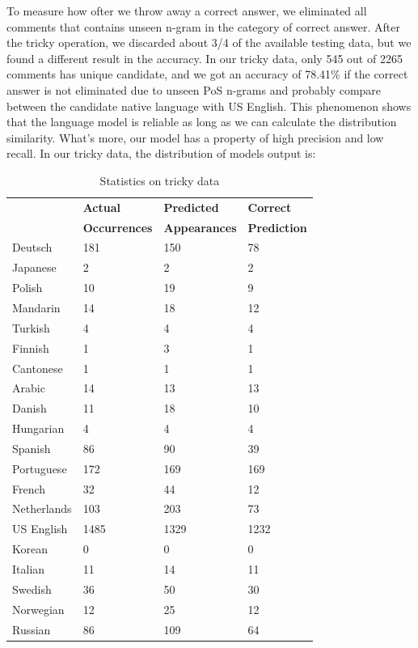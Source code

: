 \documentclass[11pt]{article}
\begin{document}
To measure how ofter we throw away a correct answer, we eliminated all comments that contains unseen n-gram in the category of correct answer. After the tricky operation, we discarded about 3/4 of the available testing data, but we found a different result in the accuracy. In our tricky data, only 545 out of 2265 comments has unique candidate, and we got an accuracy of 78.41\% if the correct answer is not eliminated due to unseen PoS n-grams and probably compare between the candidate native language with US English. This phenomenon shows that the language model is reliable as long as we can calculate the distribution similarity. What's more, our model has a property of high precision and low recall. In our tricky data, the distribution of models output is:  

\begin{table}[h]
\begin{center}
\small\addtolength{\tabcolsep}{-5pt}
\begin{tabular}{|l|l|l|l|}
\hline & \bf Actual & \bf Predicted & \bf Correct \\ 
& \bf Occurrences & \bf Appearances & \bf Prediction \\ \hline
Deutsch & 181 & 150 & 78 \\
Japanese & 2 & 2 & 2 \\
Polish & 10 & 19 & 9 \\
Mandarin & 14 & 18 & 12 \\
Turkish & 4 & 4 & 4 \\
Finnish & 1 & 3 & 1 \\
Cantonese & 1 & 1 & 1 \\
Arabic & 14 & 13 & 13 \\
Danish & 11 & 18 & 10 \\
Hungarian & 4 & 4 & 4 \\
Spanish & 86 & 90 & 39 \\
Portuguese & 172 & 169 & 169 \\
French & 32 & 44 & 12 \\
Netherlands & 103 & 203 & 73 \\
US English & 1485 & 1329 & 1232 \\
Korean & 0 & 0 & 0 \\
Italian & 11 & 14 & 11\\
Swedish & 36 & 50 & 30 \\
Norwegian & 12 & 25 & 12 \\
Russian & 86 & 109 & 64 \\
\hline
\end{tabular}
\end{center}
\caption{\label{font-table} Statistics on tricky data }
\end{table}
\end{document}
